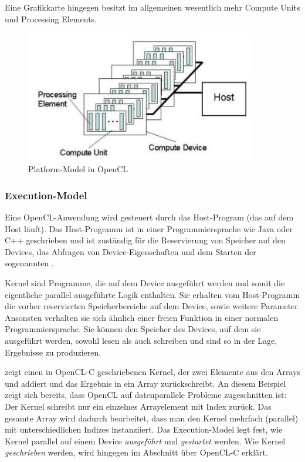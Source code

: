 Eine Grafikkarte hingegen besitzt im allgemeinen wesentlich mehr
Compute Units und Processing Elements.

\begin{figure}[ht]
\includegraphics[width=10cm]{images/opencl_platform_model}
\caption{Platform-Model in OpenCL}
\label{fig:opencl_platform_model}
\end{figure}

\subsubsection{Execution-Model}
\label{sec:opencl_execution_model}

Eine OpenCL-Anwendung wird gesteuert durch das Host-Program (das auf
dem Host läuft). Das Host-Programm ist in einer Programmiersprache wie
Java oder C++ geschrieben und ist zuständig für die Reservierung von
Speicher auf den Devices, das Abfragen von Device-Eigenschaften und
dem Starten der sogenannten .

Kernel sind Programme, die auf dem Device ausgeführt werden und somit
die eigentliche parallel ausgeführte Logik enthalten. Sie erhalten vom
Host-Programm die vorher reservierten Speicherbereiche auf dem Device,
sowie weitere Parameter. Ansonsten verhalten sie sich ähnlich einer
freien Funktion in einer normalen Programmiersprache. Sie können den
Speicher des Devices, auf dem sie ausgeführt werden, sowohl lesen als
auch schreiben und sind so in der Lage, Ergebnisse zu produzieren.

 zeigt einen in
OpenCL-C geschriebenen Kernel, der zwei Elemente aus den Arrays
 und  addiert und das
Ergebnis in ein Array  zurückschreibt. An
diesem Beispiel zeigt sich bereits, dass OpenCL auf datenparallele
Probleme zugeschnitten ist: Der Kernel schreibt nur ein einzelnes
Arrayelement mit Index  zurück. Das gesamte Array
wird dadurch bearbeitet, dass man den Kernel mehrfach (parallel) mit
unterschiedlichen Indizes instanziiert. Das Execution-Model legt fest,
wie Kernel parallel auf einem Device \emph{ausgeführt} und
\emph{gestartet} werden. Wie Kernel \emph{geschrieben} werden, wird
hingegen im Abschnitt über OpenCL-C erklärt.

